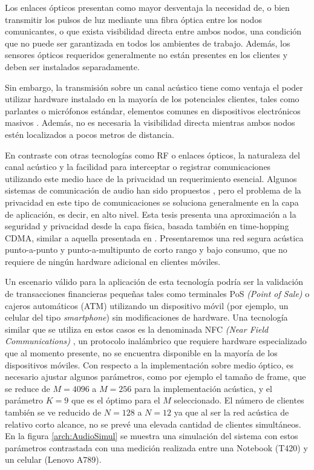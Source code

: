 Los enlaces ópticos presentan como mayor desventaja la necesidad de, o bien transmitir los pulsos de luz mediante una fibra óptica entre los nodos comunicantes, o que exista visibilidad directa entre ambos nodos, una condición que no puede ser garantizada en todos los ambientes de trabajo. Además, los sensores ópticos requeridos generalmente no están presentes en los clientes y deben ser instalados separadamente.

Sin embargo, la transmisión sobre un canal acústico tiene como ventaja el poder utilizar hardware instalado en la mayoría de los potenciales clientes, tales como parlantes o micrófonos estándar, elementos comunes en dispositivos electrónicos masivos \cite{citeulike:12800468}. Además, no es necesaria la visibilidad directa mientras ambos nodos estén localizados a pocos metros de distancia.

En contraste con otras tecnologías como RF o enlaces ópticos, la naturaleza del canal acústico y la facilidad para interceptar o registrar comunicaciones utilizando este medio hace de la privacidad un requerimiento esencial. Algunos sistemas de comunicación de audio han sido propuestos \cite{august2002apparatus}, pero el problema de la privacidad en este tipo de comunicaciones se soluciona generalmente en la capa de aplicación, es decir, en alto nivel. Esta tesis presenta una aproximación a la seguridad y privacidad desde la capa física, basada también en time-hopping CDMA, similar a aquella presentada en \cite{6476559}. Presentaremos una red segura acústica punto-a-punto y punto-a-multipunto de corto rango y bajo consumo, que no requiere de ningún hardware adicional en clientes móviles.

Un escenario válido para la aplicación de esta tecnología podría ser la validación de transacciones financieras pequeñas tales como terminales PoS \textit{(Point of Sale)} o cajeros automáticos (ATM) utilizando un dispositivo móvil (por ejemplo, un celular del tipo \textit{smartphone}) sin modificaciones de hardware. Una tecnología similar que se utiliza en estos casos es la denominada NFC \textit{(Near Field Communications)} \cite{nikitin2007overview}, un protocolo inalámbrico que requiere hardware especializado que al momento presente, no se encuentra disponible en la mayoría de los dispositivos móviles.
Con respecto a la implementación sobre medio óptico, es necesario ajustar algunos parámetros, como por ejemplo el tamaño de frame, que se reduce de $M=4096$ a $M=256$ para la implementación acústica, y el parámetro $K=9$ que es el óptimo para el $M$ seleccionado. El número de clientes también se ve reducido de $N=128$ a $N=12$ ya que al ser la red acústica de relativo corto alcance, no se prevé una elevada cantidad de clientes simultáneos. En la figura \ref{arch:AudioSimul} se muestra una simulación del sistema con estos parámetros contrastada con una medición realizada entre una Notebook (T420) y un celular (Lenovo A789).

